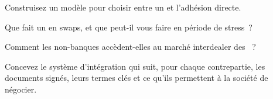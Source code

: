 \begin{interviewq}\label{iq:m2:getting-access-rates-credit:3}
Construisez un modèle pour choisir entre un  et l'adhésion directe.
\end{interviewq}

\begin{interviewq}\label{iq:m2:getting-access-rates-credit:4}
Que fait un  en swaps, et que peut-il vous faire en période de stress~?
\end{interviewq}

\begin{interviewq}\label{iq:m2:getting-access-rates-credit:5}
Comment les non-banques accèdent-elles au marché interdealer des ~?
\end{interviewq}

\begin{interviewq}\label{iq:m2:getting-access-rates-credit:6}
Concevez le système d'intégration qui suit, pour chaque contrepartie, les documents signés,
leurs termes clés et ce qu'ils permettent à la société de négocier.
\end{interviewq}
